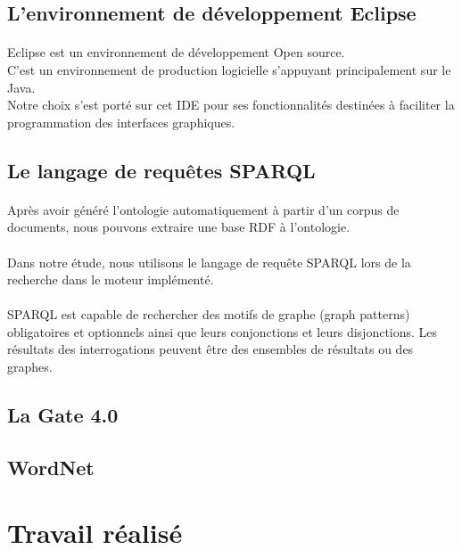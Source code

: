 \documentclass[12pt, a4paper, oneside]{book}
\begin{document}
\subsection{L'environnement de développement Eclipse}
\paragraph{}
Eclipse est un environnement de développement Open source.\\
C'est un environnement de production logicielle s'appuyant principalement sur le Java.\\
Notre choix s'est porté sur cet IDE pour ses fonctionnalités destinées à faciliter la programmation des interfaces graphiques.

\subsection{Le langage de requêtes SPARQL}
\paragraph{}
Après avoir généré l'ontologie automatiquement à partir d'un corpus de documents, nous pouvons extraire une base RDF à l'ontologie.
\paragraph{}
Dans notre étude, nous utilisons le langage de requête SPARQL lors de la recherche dans le moteur implémenté.
\paragraph{}
SPARQL est capable de rechercher des motifs de graphe (graph patterns) obligatoires et optionnels ainsi que leurs conjonctions et leurs disjonctions.
Les résultats des interrogations peuvent être des ensembles de résultats ou des graphes.

\subsection{La Gate 4.0}

\subsection{WordNet}



\section{Travail réalisé}
\end{document}
